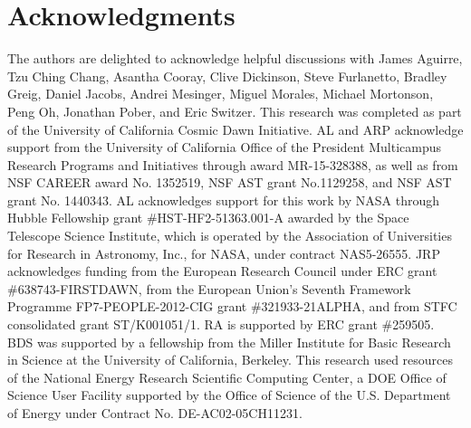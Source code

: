 \documentclass[twocolumn,aps,prd,nofootinbib,showpacs,superscriptaddress]{revtex4-1}
\begin{document}
\section*{Acknowledgments}
The authors are delighted to acknowledge helpful discussions with James Aguirre, Tzu Ching Chang, Asantha Cooray, Clive Dickinson, Steve Furlanetto, Bradley Greig, Daniel Jacobs, Andrei Mesinger, Miguel Morales, Michael Mortonson, Peng Oh, Jonathan Pober, and Eric Switzer. This research was completed as part of the University of California Cosmic Dawn Initiative. AL and ARP acknowledge support from the University of California Office of the President Multicampus Research Programs and Initiatives through award MR-15-328388, as well as from NSF CAREER award No. 1352519, NSF AST grant No.1129258, and NSF AST grant No. 1440343. AL acknowledges support for this work by NASA through Hubble Fellowship grant \#HST-HF2-51363.001-A awarded by the Space Telescope Science Institute, which is operated by the Association of Universities for Research in Astronomy, Inc., for NASA, under contract NAS5-26555. JRP acknowledges funding from the European Research Council under ERC grant \#638743-FIRSTDAWN, from the European Union's Seventh Framework Programme FP7-PEOPLE-2012-CIG grant \#321933-21ALPHA, and from STFC consolidated grant ST/K001051/1. RA is supported by ERC grant \#259505. BDS was supported by a
fellowship from the Miller Institute for Basic Research in Science at the University of California, Berkeley. This research used resources of the National Energy Research Scientific Computing Center, a DOE Office of Science User Facility supported by the Office of Science of the U.S. Department of Energy under Contract No. DE-AC02-05CH11231. 




\end{document}

